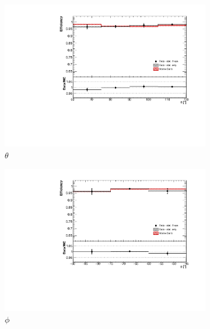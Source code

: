 \documentclass[a4paper,11pt]{article}
\begin{document}
\begin{figure}[htbp]
  \begin{center}
    \begin{subfigure}{0.5\textwidth}
      \includegraphics[width=\linewidth]{figures/theta.pdf}
      \caption{$\theta$} \label{fig:theta}
    \end{subfigure}\begin{subfigure}{0.5\textwidth}
      \includegraphics[width=\linewidth]{figures/phi.pdf}
      \caption{$\phi$} \label{fig:phi}
    \end{subfigure}
    \begin{subfigure}{0.5\textwidth}

\end{subfigure}
\end{center}
\end{figure}
\end{document}
